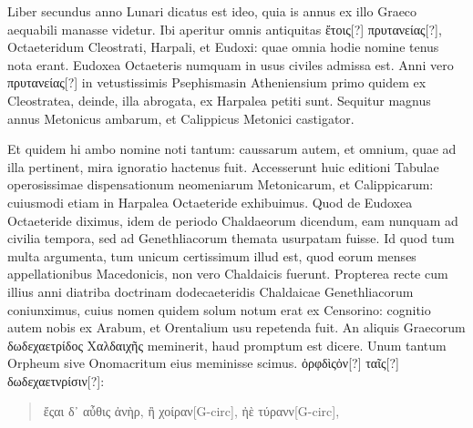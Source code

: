 \begin{parnumbers}
Liber secundus anno Lunari dicatus est ideo, quia is annus ex illo
Graeco aequabili manasse videtur.
Ibi aperitur omnis antiquitas \textgreek{ἔτοις[?]
πρυτανείας[?]}, Octaeteridum Cleostrati, Harpali, et Eudoxi: quae omnia
hodie nomine tenus nota erant.
Eudoxea Octaeteris numquam
in usus civiles admissa est.
Anni vero \textgreek{πρυτανείας[?]} in vetustissimis Psephismasin
Atheniensium primo quidem ex Cleostratea, deinde, illa
abrogata, ex Harpalea petiti sunt.
{}
Sequitur magnus annus Metonicus
ambarum, et Calippicus Metonici castigator.

Et quidem hi
ambo nomine noti tantum: caussarum autem, et omnium, quae ad
illa pertinent, mira ignoratio hactenus fuit.
Accesserunt huic editioni
Tabulae operosissimae dispensationum neomeniarum Metonicarum,
et Calippicarum: cuiusmodi etiam in Harpalea Octaeteride
exhibuimus. 
Quod de Eudoxea Octaeteride diximus, idem de
periodo Chaldaeorum dicendum, eam nunquam ad civilia tempora,
sed ad Genethliacorum themata usurpatam fuisse.
Id quod tum
multa argumenta, tum unicum certissimum illud est, quod eorum
menses appellationibus Macedonicis, non vero Chaldaicis fuerunt.
Propterea recte cum illius anni diatriba doctrinam dodecaeteridis
Chaldaicae Genethliacorum coniunximus, cuius nomen quidem
solum notum erat ex Censorino: cognitio autem nobis ex Arabum,
et Orentalium usu repetenda fuit.
An aliquis Graecorum \textgreek{δωδεχαετρίδος Χαλδαιχῆς}
meminerit, haud promptum est dicere.
Unum tantum Orpheum sive Onomacritum eius meminisse scimus. 
\textgreek{ὀρφδὶςὀν[?] ταῖς[?] δωδεχαετνρίσιν[?]:}
\begin{quote}
\begin{greek}
ἔςαι δ᾽ αὖθις ἀνὴρ, ἢ χοίραν[G-circ], ἠὲ τύρανν[G-circ],


\end{greek}
\end{quote}
\end{parnumbers}
